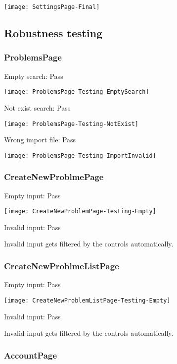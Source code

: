 \documentclass[report.tex]{subfiles}
\begin{document}
\texttt{[image: SettingsPage-Final]}

\subsection{Robustness testing}

\subsubsection{ProblemsPage}

Empty search: Pass

\texttt{[image: ProblemsPage-Testing-EmptySearch]}

Not exist search: Pass

\texttt{[image: ProblemsPage-Testing-NotExist]}

Wrong import file: Pass

\texttt{[image: ProblemsPage-Testing-ImportInvalid]}

\subsubsection{CreateNewProblmePage}

Empty input: Pass

\texttt{[image: CreateNewProblemPage-Testing-Empty]}

Invalid input: Pass

Invalid input gets filtered by the controls automatically.

\subsubsection{CreateNewProblmeListPage}

Empty input: Pass

\texttt{[image: CreateNewProblemListPage-Testing-Empty]}

Invalid input: Pass

Invalid input gets filtered by the controls automatically.

\subsubsection{AccountPage}
\end{document}
